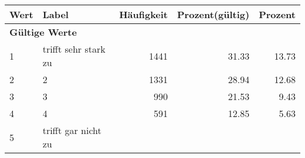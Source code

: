      \begin{longtable}{lXrrr}
     \toprule
     \textbf{Wert} & \textbf{Label} & \textbf{Häufigkeit} & \textbf{Prozent(gültig)} & \textbf{Prozent} \\
     \endhead
     \midrule
     \multicolumn{5}{l}{\textbf{Gültige Werte}}\\

     1 &
     \multicolumn{1}{X}{ trifft sehr stark zu   } &


       \num{1441} &
       \num[round-mode=places,round-precision=2]{31,33} &
         \num[round-mode=places,round-precision=2]{13,73} \\

     2 &
     \multicolumn{1}{X}{ 2   } &


       \num{1331} &
       \num[round-mode=places,round-precision=2]{28,94} &
         \num[round-mode=places,round-precision=2]{12,68} \\

     3 &
     \multicolumn{1}{X}{ 3   } &


       \num{990} &
       \num[round-mode=places,round-precision=2]{21,53} &
         \num[round-mode=places,round-precision=2]{9,43} \\

     4 &
     \multicolumn{1}{X}{ 4   } &


       \num{591} &
       \num[round-mode=places,round-precision=2]{12,85} &
         \num[round-mode=places,round-precision=2]{5,63} \\

     5 &
     \multicolumn{1}{X}{ trifft gar nicht zu   } &



\end{longtable}
